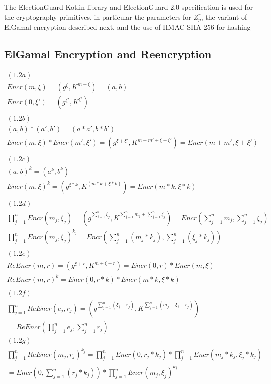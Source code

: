 \documentclass{article}
\begin{document}
The ElectionGuard Kotlin library \cite{Caron23} and ElectionGuard 2.0 specification \cite{Benaloh23} is used for the cryptography primitives, in particular the
parameters for $Z_{p}^{r}$, the variant of ElGamal encryption described
next, and the use of HMAC-SHA-256 for hashing

\subsection{ElGamal Encryption and Reencryption}

\begin{align*}
(1.2a)\\
Encr(m,\xi)=(g^{\xi},K^{m+\xi})=(a,b)\\
Encr(0,\xi')=(g^{\xi'},K^{\xi'})\\
\\
(1.2b)\\
(a,b)*(a',b')=(a*a',b*b')\\
Encr(m,\xi)*Encr(m',\xi')=(g^{\xi+\xi'},K^{m+m'+\xi+\xi'})=Encr(m+m',\xi+\xi')\\
\\
(1.2c)\\
(a,b)^{k}=(a^{k},b^{k})\\
Encr(m,\xi)^{k}=(g^{\xi*k},K^{(m*k+\xi*k)})=Encr(m*k,\xi*k)\\
\\
(1.2d)\\
\prod_{j=1}^{n}Encr(m_{j},\xi_{j})=(g^{\sum_{j=1}^{n}\xi_{j}},K^{\sum_{j=1}^{n}m_{j}+\sum_{j=1}^{n}\xi_{j}})=Encr(\sum_{j=1}^{n}m_{j},\sum_{j=1}^{n}\xi_{j})\\
\prod_{j=1}^{n}Encr(m_{j},\xi_{j})^{k_{j}}=Encr(\sum_{j=1}^{n}(m_{j}*k_{j}),\sum_{j=1}^{n}(\xi_{j}*k_{j}))\\
\\
(1.2e)\\
ReEncr(m,r)=(g^{\xi+r},K^{m+\xi+r})=Encr(0,r)*Encr(m,\xi)\\
ReEncr(m,r)^{k}=Encr(0,r*k)*Encr(m*k,\xi*k)\\
\\
(1.2f)\\
\prod_{j=1}^{n}ReEncr(e_{j},r_{j})=(g^{\sum_{j=1}^{n}(\xi_{j}+r_{j})},K^{\sum_{j=1}^{n}(m_{j}+\xi_{j}+r_{j})})\\
=ReEncr(\prod_{j=1}^{n}e_{j},\sum_{j=1}^{n}r_{j})\\
(1.2g)\\
\prod_{j=1}^{n}ReEncr(m_{j},r_{j})^{k_{j}}=\prod_{j=1}^{n}Encr(0,r_{j}*k_{j})*\prod_{j=1}^{n}Encr(m_{j}*k_{j},\xi_{j}*k_{j})\\
=Encr(0,\sum_{j=1}^{n}(r_{j}*k_{j}))*\prod_{j=1}^{n}Encr(m_{j},\xi_{j})^{k_{j}}\\
\end{align*}
\end{document}
